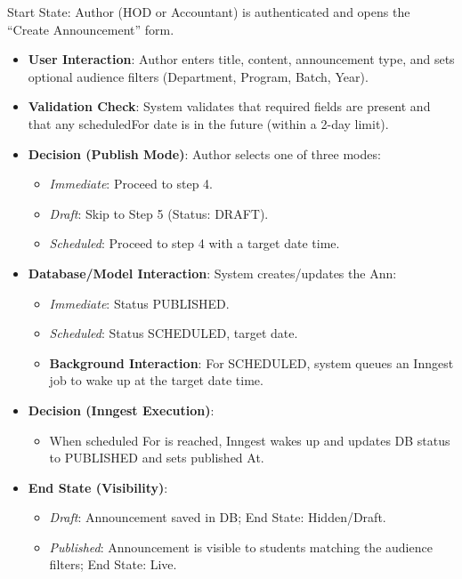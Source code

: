 Start State: Author (HOD or Accountant) is authenticated and opens the ``Create Announcement'' form.

\begin{itemize}
    \item \textbf{User Interaction}: Author enters title, content, announcement type, and sets optional audience filters (Department, Program, Batch, Year).

    \item \textbf{Validation Check}: System validates that required fields are present and that any scheduledFor date is in the future (within a 2-day limit).

    \item \textbf{Decision (Publish Mode)}: Author selects one of three modes:
    \begin{itemize}
        \item \textit{Immediate}: Proceed to step 4.
        \item \textit{Draft}: Skip to Step 5 (Status: DRAFT).
        \item \textit{Scheduled}: Proceed to step 4 with a target date time.
    \end{itemize}

    \item \textbf{Database/Model Interaction}: System creates/updates the Ann:
    \begin{itemize}
        \item \textit{Immediate}: Status PUBLISHED.
        \item \textit{Scheduled}: Status SCHEDULED, target date.
        \item \textbf{Background Interaction}: For SCHEDULED, system queues an Inngest job to wake up at the target date time.
    \end{itemize}

    \item \textbf{Decision (Inngest Execution)}:
    \begin{itemize}
        \item When scheduled For is reached, Inngest wakes up and updates DB status to PUBLISHED and sets published At.
    \end{itemize}

    \item \textbf{End State (Visibility)}:
    \begin{itemize}
        \item \textit{Draft}: Announcement saved in DB; End State: Hidden/Draft.
        \item \textit{Published}: Announcement is visible to students matching the audience filters; End State: Live.
    \end{itemize}
\end{itemize}

